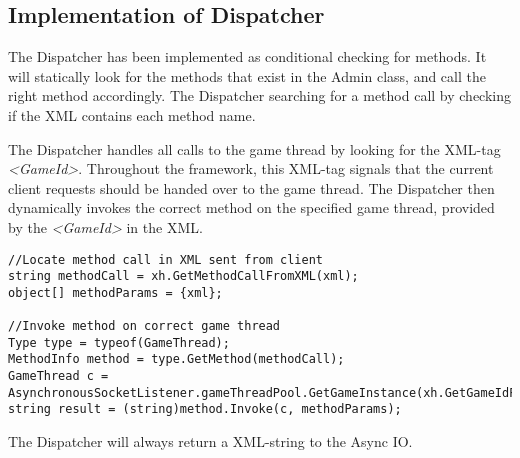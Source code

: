 \subsection{Implementation of Dispatcher}
\label{chap:dispImplementation}
The Dispatcher has been implemented as conditional checking for methods. It will statically look for the methods that exist in the Admin class, and call the right method accordingly. The Dispatcher searching for a method call by checking if the XML contains each method name.

The Dispatcher handles all calls to the game thread by looking for the XML-tag \textit{<GameId>}. Throughout the framework, this XML-tag signals that the current client requests should be handed over to the game thread. The Dispatcher then dynamically invokes the correct method on the specified game thread, provided by the \textit{<GameId>} in the XML. 

\begin{lstlisting}
//Locate method call in XML sent from client
string methodCall = xh.GetMethodCallFromXML(xml);
object[] methodParams = {xml};

//Invoke method on correct game thread
Type type = typeof(GameThread);
MethodInfo method = type.GetMethod(methodCall);
GameThread c = AsynchronousSocketListener.gameThreadPool.GetGameInstance(xh.GetGameIdFromXML(xml));
string result = (string)method.Invoke(c, methodParams);
\end{lstlisting}

The Dispatcher will always return a XML-string to the Async IO.